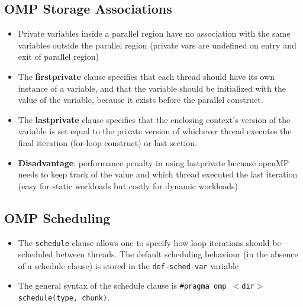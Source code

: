 \documentclass{article}
\begin{document}
\subsection{OMP Storage Associations}
\begin{itemize}
    \item Private variables inside a parallel region have no association with the same variables outside the parallel region (private vars are undefined on entry and exit of parallel region)
    
    \item The \textbf{firstprivate} clause specifies that each thread should have its own instance of a variable, and that the variable should be initialized with the value of the variable, because it exists before the parallel construct.
    
    \item The \textbf{lastprivate} clause specifies that the enclosing context's version of the variable is set equal to the private version of whichever thread executes the final iteration (for-loop construct) or last section. 
    
    \item \textbf{Disadvantage}: performance penalty in using lastprivate becuase openMP needs to keep track of the value and which thread executed the last iteration (easy for static workloads but costly for dynamic workloads)
\end{itemize}

\subsection{OMP Scheduling}
\begin{itemize}
    \item The \texttt{schedule} clause allows one to specify how loop iterations should be scheduled between threads. The default scheduling behaviour (in the absence of a schedule clause) is stored in the \texttt{def-sched-var} variable
    
    \item The general syntax of the schedule clause is \texttt{\#pragma omp $<$dir$>$ schedule(type, chunk)}.
\end{itemize}
\end{document}
